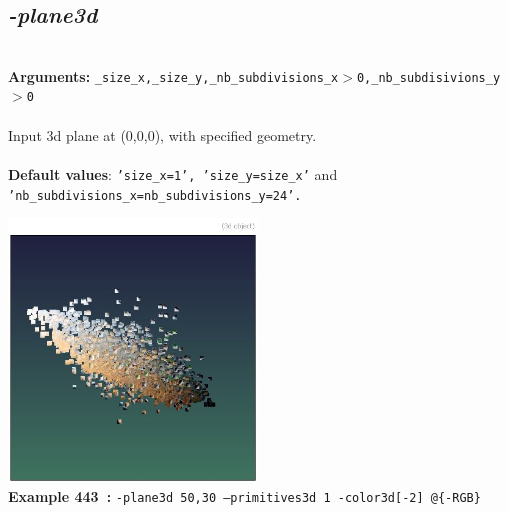 \documentclass[a4paper,11pt,twoside]{book}
\begin{document}
\subsection{\emph{-plane3d} }\vspace*{-0.5em}
~\\\textbf{Arguments: } 
{\small \texttt{\_size\_x,\_size\_y,\_nb\_subdivisions\_x$>$0,\_nb\_subdisivions\_y$>$0}}\\~\\
Input 3d plane at (0,0,0), with specified geometry.
~\\~\\\textbf{Default values}: {\small \texttt{'size\_x=1', 'size\_y=size\_x'} and \texttt{'nb\_subdivisions\_x=nb\_subdivisions\_y=24'.}}
\begin{center}\includegraphics[keepaspectratio=true,height=7cm,width=\textwidth]{img/gmic_def443.jpg}\\
{\footnotesize \textbf{Example 443~:} \texttt{-plane3d 50,30 --primitives3d 1 -color3d[-2] @\{-RGB\}}}
\end{center}
\end{document}
